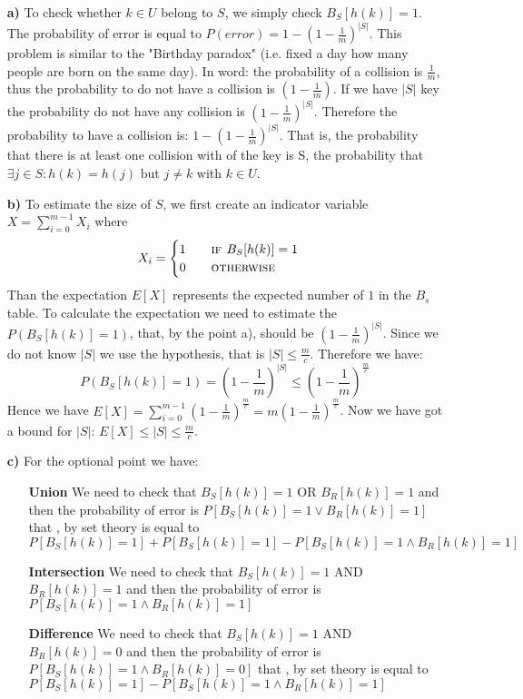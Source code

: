 \documentclass[a4paper]{article}
\begin{document}
\begin{itemize}
\item[\textbf{a)}] To check whether $k\in U$ belong to $S$, we simply check $B_S[h(k)]=1$. The probability of error is equal to $P(error)=1-(1 - \frac{1}{m})^{|S|}$. This problem is similar to the "Birthday paradox" (i.e. fixed a day how many people are born on the same day). In word: the probability of a collision is $\frac{1}{m}$, thus the probability to do not have a collision is $(1-\frac{1}{m})$. If we have $|S|$ key the probability do not have any collision is $(1 - \frac{1}{m})^{|S|}$. Therefore the probability to have a collision is: $1-(1 - \frac{1}{m})^{|S|}$. That is, the probability that there is at least one collision with of the key is S, the probability that $\exists j\in S : h(k)=h(j)$ but $j\neq k$ with $k \in U$.
\item[\textbf{b)}] To estimate the size of $S$, we first create an indicator variable $X=\sum_{i=0}^{m-1}X_i$ where
\begin{equation}
X_{i} =  
\begin{cases} 
1 \qquad \textsc{if }B_S[h(k)]=1\\
0 \qquad \textsc{otherwise}
\end{cases}
\nonumber
\end{equation}
Than the expectation $E[X]$ represents the expected number of $1$ in the $B_s$ table. To calculate the expectation we need to estimate the $P(B_S[h(k)]=1)$, that, by the point a), should be $(1 - \frac{1}{m})^{|S|}$. Since we do not know $|S|$ we use the hypothesis, that is $|S|\leq \frac{m}{c}$. Therefore we have:
\begin{equation}
P(B_S[h(k)]=1)=(1 - \frac{1}{m})^{|S|} \leq (1 - \frac{1}{m})^{\frac{m}{c}}
\nonumber
\end{equation}
Hence we have $E[X]= \sum_{i=0}^{m-1} (1 - \frac{1}{m})^{\frac{m}{c}}=m(1 - \frac{1}{m})^{\frac{m}{c}}$. Now we have got a bound for $|S|$: $E[X]\leq|S|\leq \frac{m}{c}$.
\item[\textbf{c)}] For the optional point we have:
	\begin{itemize}
	\item[\textbf{Union}] We need to check that $B_S[h(k)]=1 $ OR $B_R[h(k)]=1$ and then the probability of error is $P[B_S[h(k)]=1 \lor B_R[h(k)]=1]$ that , by set theory is equal to $P[B_S[h(k)]=1] +P[B_S[h(k)]=1] - P[B_S[h(k)]=1 \land B_R[h(k)]=1]$
	\item[\textbf{Intersection}] We need to check that $B_S[h(k)]=1 $ AND $B_R[h(k)]=1$ and then the probability of error is $P[B_S[h(k)]=1 \land B_R[h(k)]=1]$ 
	\item[\textbf{Difference}] We need to check that $B_S[h(k)]=1 $ AND $B_R[h(k)]=0$ and then the probability of error is $P[B_S[h(k)]=1 \land B_R[h(k)]=0]$ that , by set theory is equal to  $P[B_S[h(k)]=1] - P[B_S[h(k)]=1 \land B_R[h(k)]=1]$
	\end{itemize}
\end{itemize}
\end{document}
